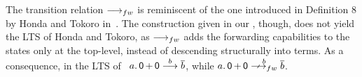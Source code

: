 
The transition relation $\sta{}$ is reminiscent of the one introduced
in Definition 8 by Honda and
  Tokoro in~\cite{DBLP:conf/ecoop/HondaT91}.  The construction given in
our , though, does not yield the LTS of Honda and Tokoro,
as $\sta{}$ adds the forwarding capabilities to the states only at the
top-level, instead of descending structurally into terms. As a
consequence, in the LTS of~\cite{DBLP:conf/ecoop/HondaT91}
$a.\mathop{\textsf{0}} + \mathop{\textsf{0}} \mathrel{\overset{ b }\longrightarrow} \overline{ b }$, while
$\aa.\Nil + \Nil \Nsta{ \ab } \co{ \ab }$.


